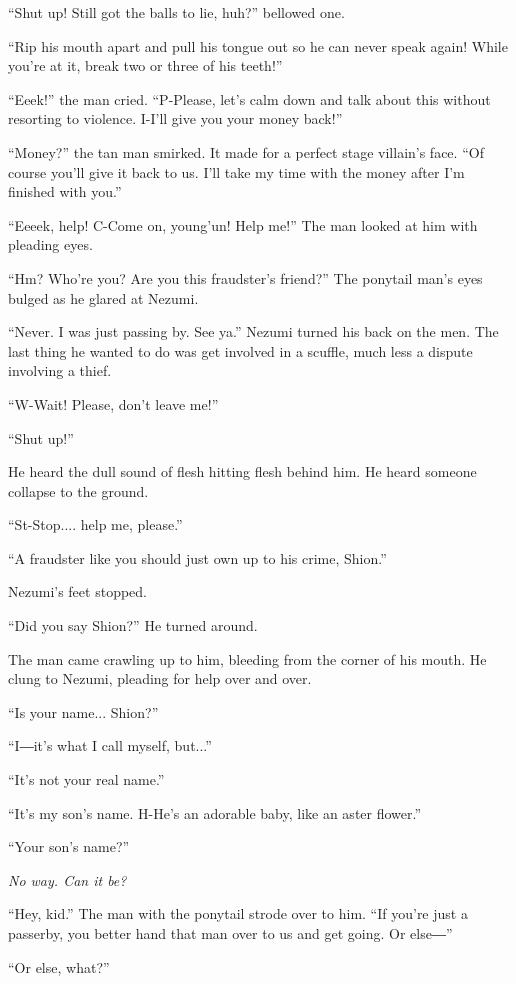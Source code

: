 ``Shut up! Still got the balls to lie, huh?'' bellowed one.

``Rip his mouth apart and pull his tongue out so he can never speak
again! While you're at it, break two or three of his teeth!''

``Eeek!'' the man cried. ``P-Please, let's calm down and talk about this
without resorting to violence. I-I'll give you your money back!''

``Money?'' the tan man smirked. It made for a perfect stage villain's
face. ``Of course you'll give it back to us. I'll take my time with the
money after I'm finished with you.''

``Eeeek, help! C-Come on, young'un! Help me!'' The man looked at him
with pleading eyes.

``Hm? Who're you? Are you this fraudster's friend?'' The ponytail man's
eyes bulged as he glared at Nezumi.

``Never. I was just passing by. See ya.'' Nezumi turned his back on the
men. The last thing he wanted to do was get involved in a scuffle, much
less a dispute involving a thief.

``W-Wait! Please, don't leave me!''

``Shut up!''

He heard the dull sound of flesh hitting flesh behind him. He heard
someone collapse to the ground.

``St-Stop.... help me, please.''

``A fraudster like you should just own up to his crime, Shion.''

Nezumi's feet stopped.

``Did you say Shion?'' He turned around.

The man came crawling up to him, bleeding from the corner of his mouth.
He clung to Nezumi, pleading for help over and over.

``Is your name... Shion?''

``I―it's what I call myself, but...''

``It's not your real name.''

``It's my son's name. H-He's an adorable baby, like an aster flower.''

``Your son's name?''

\emph{No way. Can it be?}

``Hey, kid.'' The man with the ponytail strode over to him. ``If you're
just a passerby, you better hand that man over to us and get going. Or
else―''

``Or else, what?''

